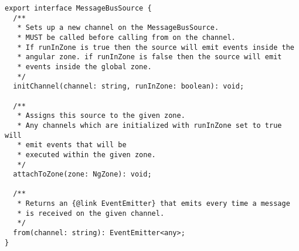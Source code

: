 \begin{verbatim}
export interface MessageBusSource {
  /**
   * Sets up a new channel on the MessageBusSource.
   * MUST be called before calling from on the channel.
   * If runInZone is true then the source will emit events inside the
   * angular zone. if runInZone is false then the source will emit
   * events inside the global zone.
   */
  initChannel(channel: string, runInZone: boolean): void;

  /**
   * Assigns this source to the given zone.
   * Any channels which are initialized with runInZone set to true will
   * emit events that will be
   * executed within the given zone.
   */
  attachToZone(zone: NgZone): void;

  /**
   * Returns an {@link EventEmitter} that emits every time a message
   * is received on the given channel.
   */
  from(channel: string): EventEmitter<any>;
}
\end{verbatim}
